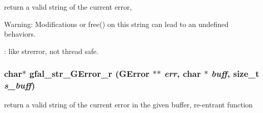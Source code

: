 return a valid string of the current error, \begin{Desc}
\item[Warning:]Modifications or free() on this string can lead to an undefined behaviors. 

: like strerror, not thread safe. \end{Desc}
\subsubsection{\setlength{\rightskip}{0pt plus 5cm}char$\ast$ gfal\_\-str\_\-GError\_\-r (GError $\ast$$\ast$ {\em err}, char $\ast$ {\em buff}, size\_\-t {\em s\_\-buff})}\label{gfal__common__errverbose_8c_6e7f412b0a892e49a7f2277562c59b4d}


return a valid string of the current error in the given buffer, re-entrant function 